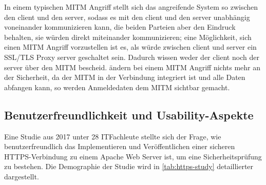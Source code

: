 In einem typischen \ac{MITM} Angriff stellt sich das angreifende System so zwischen den \gls{client} und den \gls{server}, sodass es mit den \gls{client} und den \gls{server} unabhängig voneinander kommunizieren kann, die beiden Parteien aber den Eindruck behalten, sie würden direkt miteinander kommunizieren; eine Möglichkeit, sich einen \ac{MITM} Angriff vorzustellen ist es, als würde zwischen \gls{client} und \gls{server} ein \ac{SSL}/\ac{TLS} Proxy \gls{server} geschaltet sein.\autocite[\vglf][]{greenwood2014smv} Dadurch wissen weder der \gls{client} noch der \gls{server} über den \ac{MITM} bescheid.
 ändern bei einem \ac{MITM} Angriff nichts mehr an der Sicherheit, da der \ac{MITM} in der Verbindung integriert ist und alle Daten abfangen kann, so werden \zb Anmeldedaten dem \ac{MITM} sichtbar gemacht.\autocite[\vglf][]{greenwood2014smv}

\subsection[Benutzerfreundlichkeit und Usability-Aspekte]{Benutzerfreundlichkeit und Usability-Aspekte}\label{subsec:benutzerfreundlichkeit_und_usability-aspekte}
Eine Studie aus 2017 unter 28 IT\nonbreakdash Fachleute stellte sich der Frage, wie benutzerfreundlich das Implementieren und Veröffentlichen einer sicheren \ac{HTTPS}-Verbindung zu einem Apache Web Server ist, um eine Sicherheitsprüfung zu bestehen.\autocite[\vglf][]{usabilityHTTPS:2017}
Die Demographie der Studie wird in \autoref{tab:https-study}\autocite[\vglf][]{usabilityHTTPS:2017} detaillierter dargestellt.

